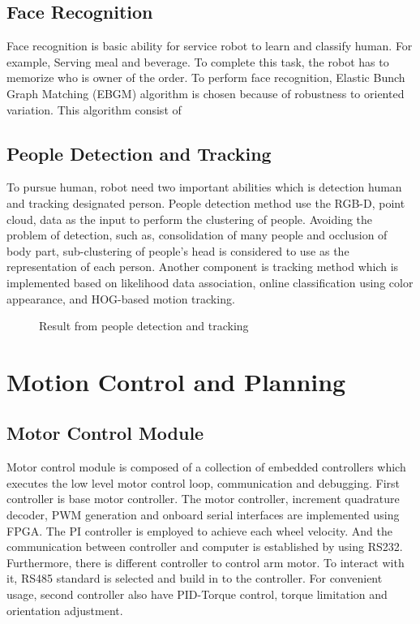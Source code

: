 \documentclass{llncs}
\begin{document}
\subsection{Face Recognition}

Face recognition is basic ability for service robot to learn and classify human. For example, Serving meal and beverage. To complete this task, the robot has to memorize who is owner of the order. To perform face recognition, Elastic Bunch Graph Matching (EBGM) algorithm is chosen because of robustness to oriented variation. This algorithm consist of 

\subsection{People Detection and Tracking}

To pursue human, robot need two important abilities which is detection human and tracking designated person. People detection method use the RGB-D, point cloud, data as the input to perform the clustering of people. Avoiding the problem of detection, such as, consolidation of many people and occlusion of body part, sub-clustering of people's head is considered to use as the representation of each person. Another component is tracking method which is implemented based on likelihood data association, online classification using color appearance, and HOG-based motion tracking\cite{pp_detect}.

\begin{figure}
\centering
\caption{Result from people detection and tracking}
\label{fig:people_detection}
\end{figure}

\section{Motion Control and Planning}

\subsection{Motor Control Module}

Motor control module is composed of a collection of embedded controllers which executes the low level motor control loop, communication and debugging. First controller is base motor controller. The motor controller, increment quadrature decoder, PWM generation and onboard serial interfaces are implemented using FPGA. The PI controller is employed to achieve each wheel velocity. And the communication between controller and computer is established by using RS232. Furthermore, there is different controller to control arm motor. To interact with it, RS485 standard is selected and build in to the controller. For convenient usage, second controller also have PID-Torque control, torque limitation and orientation adjustment\cite{con_arm}. 
\end{document}

